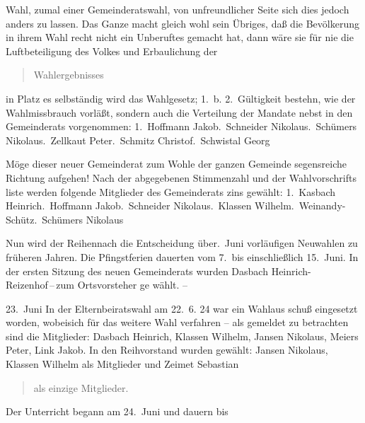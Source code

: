 

Wahl, zumal einer Gemeinderatswahl, von unfreundlicher\ob
Seite sich dies jedoch anders zu lassen. Das Ganze macht\ob
gleich wohl sein Übriges, daß die Bevölkerung in ihrem Wahl\ohb
recht nicht ein Unberuftes gemacht hat, dann wäre sie\ob
für nie die Luftbeteiligung des Volkes und Erbaulichung der

\pend
\begin{verse}
Wahlergebnisses
\end{verse}
\pstart
in Platz   es selbständig wird das Wahlgesetz; 1.\ b. 2.\ Gültigkeit\ob
bestehn, wie der Wahlmissbrauch vorläßt, sondern auch\ob
die Verteilung der Mandate nebst in den Gemeinderats\ohb
vorgenommen:     1.\ Hoffmann Jakob.\ Schneider Nikolaus.\ Schümers Nikolaus.\ Zellkaut Peter.\ Schmitz Christof.\ Schwistal Georg

Möge dieser neuer Gemeinderat zum Wohle der\ob
ganzen Gemeinde segensreiche Richtung aufgehen!\ob
Nach der abgegebenen Stimmenzahl und der Wahlvorschrifts\ohb
liste werden folgende Mitglieder des Gemeinderats zins\ohb
gewählt:       1.\ Kasbach Heinrich.\ Hoffmann Jakob.\ Schneider Nikolaus.\ Klassen Wilhelm.\ Weinandy-Schütz.\ Schümers Nikolaus

Nun wird der Reihennach die Entscheidung über.\ Juni    vorläufigen Neuwahlen zu früheren Jahren.\ob
Die Pfingstferien dauerten vom 7.\ bis einschließlich 15.\ Juni.\ob
In der ersten Sitzung des neuen Gemeinderats wurden\ob
Dasbach Heinrich- Reizenhof\,--\,zum Ortsvorsteher ge\ohb
wählt. –

23.\ Juni    In der Elternbeiratswahl am 22.\ 6. 24 war ein Wahlaus\ohb
schuß eingesetzt worden, wobeisich für das weitere Wahl\ohb
verfahren – als gemeldet zu betrachten sind die Mitglieder:\ob
Dasbach Heinrich, Klassen Wilhelm, Jansen Nikolaus, Meiers\ob
Peter, Link Jakob.\ob
In den Reihvorstand wurden gewählt: Jansen Nikolaus,\ob
Klassen Wilhelm als Mitglieder und Zeimet Sebastian

\pend
\begin{verse}
als einzige Mitglieder.
\end{verse}
\pstart
Der Unterricht begann am 24.\ Juni und dauern bis
\pend
